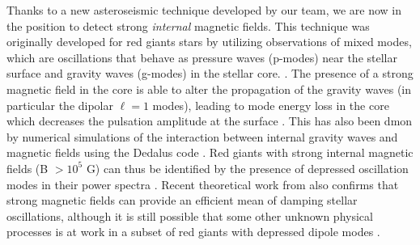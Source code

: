 Thanks to a new asteroseismic technique developed by our team, we are now in the position to detect strong {\it internal} magnetic fields. This technique was originally developed for red giants stars by utilizing observations of mixed modes, which are oscillations that behave as pressure waves (p-modes) near the stellar surface and gravity waves (g-modes) in the stellar core. \citep[e.g][]{Beck_2011}. The presence of a strong magnetic field in the core is able to alter the propagation of the gravity waves (in particular the dipolar $\ell =1$ modes),
leading to mode energy loss in the core which decreases the pulsation amplitude at the surface \citep{Fuller_2015}. This has also been dmon  by numerical simulations of the interaction between internal gravity waves and magnetic fields using the Dedalus code \citep{Lecoanet_2016}. Red giants with strong internal magnetic fields (B $> 10^5$ G) can thus be identified by the presence of depressed oscillation modes in their power spectra \citep{Fuller_2015,Stello_2016}. Recent theoretical work from \citet{2017MNRAS.467.3212L} also confirms that  strong magnetic fields can provide an efficient mean of damping stellar oscillations, although it is still possible that some other unknown physical processes is at work in a subset of red giants with depressed dipole modes \citet{Mosser_2017}.
